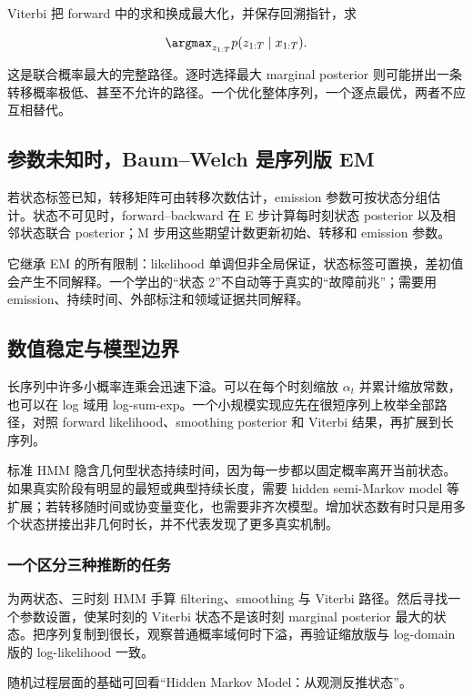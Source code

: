 Viterbi 把 forward 中的求和换成最大化，并保存回溯指针，求

\[
\argmax_{z_{1:T}}p(z_{1:T}\mid x_{1:T}).
\]

这是联合概率最大的完整路径。逐时选择最大 marginal posterior 则可能拼出一条转移概率极低、甚至不允许的路径。一个优化整体序列，一个逐点最优，两者不应互相替代。

\subsection{参数未知时，Baum--Welch 是序列版 EM}

若状态标签已知，转移矩阵可由转移次数估计，emission 参数可按状态分组估计。状态不可见时，forward--backward 在 E 步计算每时刻状态 posterior 以及相邻状态联合 posterior；M 步用这些期望计数更新初始、转移和 emission 参数。

它继承 EM 的所有限制：likelihood 单调但非全局保证，状态标签可置换，差初值会产生不同解释。一个学出的``状态 2''不自动等于真实的``故障前兆''；需要用 emission、持续时间、外部标注和领域证据共同解释。

\subsection{数值稳定与模型边界}

长序列中许多小概率连乘会迅速下溢。可以在每个时刻缩放 \(\alpha_t\) 并累计缩放常数，也可以在 log 域用 log-sum-exp。一个小规模实现应先在很短序列上枚举全部路径，对照 forward likelihood、smoothing posterior 和 Viterbi 结果，再扩展到长序列。

标准 HMM 隐含几何型状态持续时间，因为每一步都以固定概率离开当前状态。如果真实阶段有明显的最短或典型持续长度，需要 hidden semi-Markov model 等扩展；若转移随时间或协变量变化，也需要非齐次模型。增加状态数有时只是用多个状态拼接出非几何时长，并不代表发现了更多真实机制。

\subsubsection{一个区分三种推断的任务}

为两状态、三时刻 HMM 手算 filtering、smoothing 与 Viterbi 路径。然后寻找一个参数设置，使某时刻的 Viterbi 状态不是该时刻 marginal posterior 最大的状态。把序列复制到很长，观察普通概率域何时下溢，再验证缩放版与 log-domain 版的 log-likelihood 一致。

随机过程层面的基础可回看``Hidden Markov Model：从观测反推状态''。
